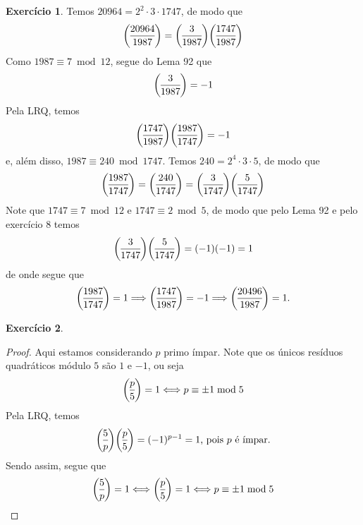 \documentclass[a4paper,12pt]{article}
\theoremstyle{definition}
\newtheorem{exercise}{Exercício}%
\newcommand{\genlegendre}[4]{%
	\genfrac{(}{)}{}{#1}{#3}{#4}%
	\if\relax\detokenize{#2}\relax\else_{\!#2}\fi
}
\newcommand{\legendre}[3][]{\genlegendre{}{#1}{#2}{#3}}
\begin{document}
	\begin{exercise}
		Temos $20964 = 2^2\cdot 3\cdot 1747$, de modo que
		\begin{align*}
		\legendre[]{20964}{1987} = \legendre[]{3}{1987}\legendre[]{1747}{1987}
		\end{align*}
		Como $1987\equiv 7\bmod 12$, segue do Lema 92 que  
		\begin{align*}
		\legendre[]{3}{1987} = -1
		\end{align*}
		Pela LRQ, temos
		\begin{align*}
		\legendre[]{1747}{1987}\legendre[]{1987}{1747} = -1
		\end{align*}
		e, além disso, $1987\equiv 240\bmod 1747$. Temos $240 = 2^4\cdot 3\cdot 5$, de modo que
		\begin{align*}
		\legendre[]{1987}{1747} = \legendre[]{240}{1747} = \legendre[]{3}{1747}\legendre[]{5}{1747}
		\end{align*}
		Note que $1747\equiv 7\bmod 12$ e $1747\equiv 2\bmod 5$, de modo que pelo Lema 92 e pelo exercício 8 temos
		\begin{align*}
		\legendre[]{3}{1747}\legendre[]{5}{1747} = (-1)(-1) = 1
		\end{align*}
		de onde segue que
		\begin{align*}
		\legendre[]{1987}{1747} = 1 \Longrightarrow \legendre[]{1747}{1987} = -1 \Longrightarrow \legendre[]{20496}{1987} = 1.
		\end{align*}
	\end{exercise}

	\begin{exercise}
		\begin{proof}
			Aqui estamos considerando $p$ primo ímpar. Note que os únicos resíduos quadráticos módulo $5$ são $1$ e $-1$, ou seja
			\begin{align*}
			\legendre[]{p}{5} = 1\Longleftrightarrow p\equiv \pm 1\bmod 5
			\end{align*}
			Pela LRQ, temos
			\begin{align*}
			\legendre[]{5}{p}\legendre[]{p}{5} = (-1)^{p-1} = 1\text{, pois } p \text{ é ímpar.}
			\end{align*}
			Sendo assim, segue que
			\begin{align*}
			\legendre[]{5}{p} = 1\Longleftrightarrow \legendre[]{p}{5} = 1\Longleftrightarrow p\equiv \pm 1\bmod 5
			\end{align*}
		\end{proof}
	\end{exercise}
\end{document}
